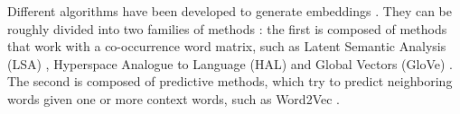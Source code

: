 Different algorithms have been developed to generate embeddings \cite[\emph{inter alia}]{bengio2003neural, collobertetal2011,mikolovetal2013, Ling:2015:naacl, lai2015recurrent}. They can be roughly divided into two families of methods \cite{baronietal2014}: the first is composed of methods that work with a co-occurrence word matrix, such as Latent Semantic Analysis (LSA) \cite{dumais1988using}, Hyperspace Analogue to Language (HAL) \cite{lund1996producing} and Global Vectors (GloVe) \cite{penningtonetal2014}. The second is composed of predictive methods, which try to predict neighboring words given one or more context words, such as Word2Vec \cite{mikolovetal2013}.





